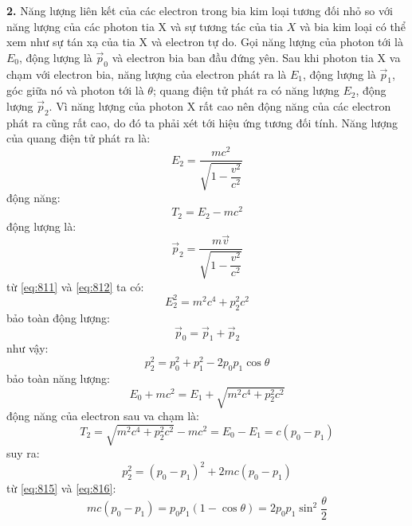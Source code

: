 \noindent\textbf{2.} Năng lượng liên kết của các electron trong bia kim loại tương đối nhỏ so với năng lượng của các photon tia X và sự tương tác của tia $X$ và bia kim loại có thể xem như sự tán xạ của tia X và electron tự do. Gọi năng lượng của photon tới là $E_{0}$, động lượng là $\vec{p}_{0}$ và electron bia ban đầu đứng yên. Sau khi photon tia X va chạm với electron bia, năng lượng của electron phát ra là $E_{1}$, động lượng là $\vec{p}_{1}$, góc giữa nó và photon tới là $\theta$; quang điện tử phát ra có năng lượng $E_{2}$, động lượng $\vec{p}_{2}$. Vì năng lượng của photon X rất cao nên động năng của các electron phát ra cũng rất cao, do đó ta phải xét tới hiệu ứng tương đối tính. Năng lượng của quang điện tử phát ra là:
\begin{equation}
  \label{eq:810}
  E_{2}=\frac{mc^{2}}{\sqrt{1-\dfrac{v^{2}}{c^{2}}}}
\end{equation}
động năng:
\begin{equation}
  \label{eq:811}
  T_{2}=E_{2}-mc^{2}
\end{equation}
động lượng là:
\begin{equation}
  \label{eq:812}
  \vec{p}_{2}=\frac{m\vec{v}}{\sqrt{1-\dfrac{v^{2}}{c^{2}}}}
\end{equation}
từ \eqref{eq:811} và \eqref{eq:812} ta có:
\begin{equation}
  \label{eq:813}
  E_{2}^{2}=m^{2}c^{4}+p_{2}^{2}c^{2}
\end{equation}
bảo toàn động lượng:
\begin{equation}
  \label{eq:814}
  \vec{p}_{0}=\vec{p}_{1}+\vec{p}_{2}
\end{equation}
như vậy:
\begin{equation}
  \label{eq:815}
  p_{2}^{2}=p_{0}^{2}+p_{1}^{2}-2p_{0}p_{1}\cos\theta
\end{equation}
bảo toàn năng lượng:
\begin{equation}
  \label{eq:816}
  E_{0}+mc^{2}=E_{1}+\sqrt{m^{2}c^{4}+p_{2}^{2}c^{2}}
\end{equation}
động năng của electron sau va chạm là:
\begin{equation}
  \label{eq:817}
  T_{2}=\sqrt{m^{2}c^{4}+p_{2}^{2}c^{2}}-mc^{2}=E_{0}-E_{1}=c(p_{0}-p_{1})
\end{equation}
suy ra:
\begin{equation}
  \label{eq:818}
  p_{2}^{2}=(p_{0}-p_{1})^{2}+2mc(p_{0}-p_{1})
\end{equation}
từ \eqref{eq:815} và \eqref{eq:816}:
\begin{equation}
  \label{eq:819}
  mc(p_{0}-p_{1})=p_{0}p_{1}(1-\cos\theta)=2p_{0}p_{1}\sin^{2}\frac{\theta}{2}
\end{equation}
